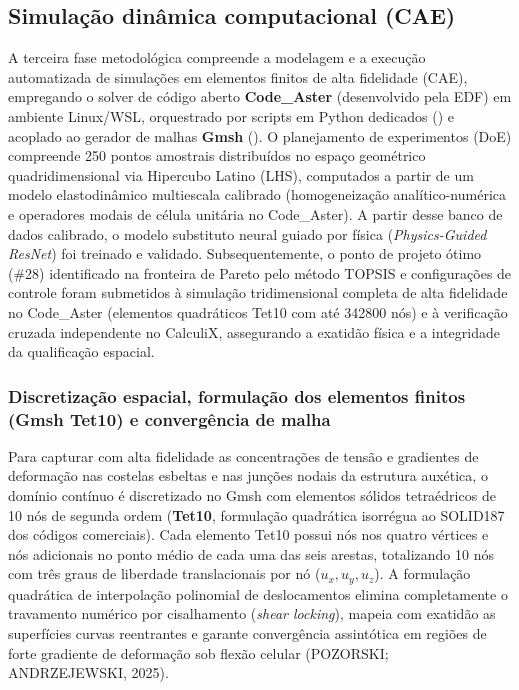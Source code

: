 \subsection{Simulação dinâmica computacional (CAE)}
\label{subsec:cae}

A terceira fase metodológica compreende a modelagem e a execução automatizada de simulações em elementos finitos de alta fidelidade (CAE), empregando o solver de código aberto \textbf{Code\_Aster} (desenvolvido pela EDF) em ambiente Linux/WSL, orquestrado por scripts em Python dedicados () e acoplado ao gerador de malhas \textbf{Gmsh} (). O planejamento de experimentos (DoE) compreende 250 pontos amostrais distribuídos no espaço geométrico quadridimensional via Hipercubo Latino (LHS), computados a partir de um modelo elastodinâmico multiescala calibrado (homogeneização analítico-numérica e operadores modais de célula unitária no Code\_Aster). A partir desse banco de dados calibrado, o modelo substituto neural guiado por física (\textit{Physics-Guided ResNet}) foi treinado e validado. Subsequentemente, o ponto de projeto ótimo (\#28) identificado na fronteira de Pareto pelo método TOPSIS e configurações de controle foram submetidos à simulação tridimensional completa de alta fidelidade no Code\_Aster (elementos quadráticos Tet10 com até \num{342800} nós) e à verificação cruzada independente no CalculiX, assegurando a exatidão física e a integridade da qualificação espacial.

\subsubsection{Discretização espacial, formulação dos elementos finitos (Gmsh Tet10) e convergência de malha}
\label{subsubsec:solid187}

Para capturar com alta fidelidade as concentrações de tensão e gradientes de deformação nas costelas esbeltas e nas junções nodais da estrutura auxética, o domínio contínuo é discretizado no Gmsh com elementos sólidos tetraédricos de 10 nós de segunda ordem (\textbf{Tet10}, formulação quadrática isorrégua ao SOLID187 dos códigos comerciais). Cada elemento Tet10 possui nós nos quatro vértices e nós adicionais no ponto médio de cada uma das seis arestas, totalizando 10 nós com três graus de liberdade translacionais por nó ($u_x, u_y, u_z$). A formulação quadrática de interpolação polinomial de deslocamentos elimina completamente o travamento numérico por cisalhamento (\textit{shear locking}), mapeia com exatidão as superfícies curvas reentrantes e garante convergência assintótica em regiões de forte gradiente de deformação sob flexão celular (POZORSKI; ANDRZEJEWSKI, 2025).

